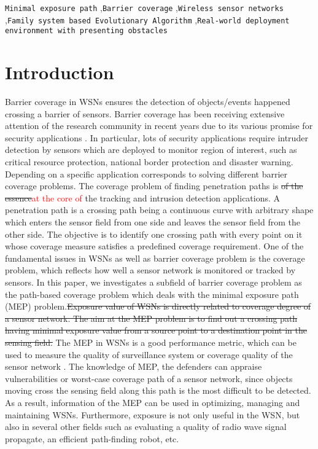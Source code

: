 \documentclass[final]{elsarticle}
\begin{document}
\begin{frontmatter}
\begin{abstract}
\end{abstract}
\begin{keyword}
\texttt{Minimal exposure path} \sep\texttt{Barrier coverage} \sep \texttt{Wireless sensor networks} \sep \texttt{Family system based Evolutionary Algorithm} \sep \texttt{Real-world deployment environment with presenting obstacles}
\end{keyword}
\end{frontmatter}
\section{Introduction}
Barrier coverage in WSNs ensures the detection of objects/events happened crossing a barrier of sensors. Barrier coverage has been receiving extensive attention of the research community in recent years due to its various promise for security applications \cite{wu2016survey,wang2011coverage,b15}. In particular, lots of security applications require intruder detection by sensors which are deployed to monitor region of interest, such as critical resource protection, national border protection and disaster warning. Depending on a specific application corresponds to solving different barrier coverage problems. The coverage problem of finding penetration paths is \sout{of the essence}\textcolor{red}{at the core of} the tracking and intrusion detection applications. A penetration path is a crossing path being a continuous curve with arbitrary shape which enters the sensor field from one side and leaves the sensor field from the other side. The objective is to identify one crossing path with every point on it whose coverage measure satisfies a predefined coverage requirement. One of the fundamental issues in WSNs as well as barrier coverage problem is the coverage problem, which reflects how well a sensor network is monitored or tracked by sensors. In this paper, we investigates a subfield of barrier coverage problem as the path-based coverage problem which deals with the minimal exposure path (MEP) problem.\sout{Exposure value of WSNs is directly related to coverage degree of a sensor network. The aim at the MEP problem is to find out a crossing path having minimal exposure value from a source point to a destination point in the sensing field.} The MEP in WSNs is a good performance metric, which can be used to measure the quality of surveillance system or coverage quality of the sensor network \cite{b13,b17}. The knowledge of MEP, the defenders can appraise vulnerabilities or worst-case coverage path of a sensor network, since objects moving cross the sensing field along this path is the most difficult to be detected. As a result, information of the MEP can be used in optimizing, managing and maintaining WSNs. Furthermore, exposure is not only useful in the WSN, but also in several other fields such as evaluating a quality of radio wave signal propagate, an efficient path-finding robot, etc.
\end{document}

